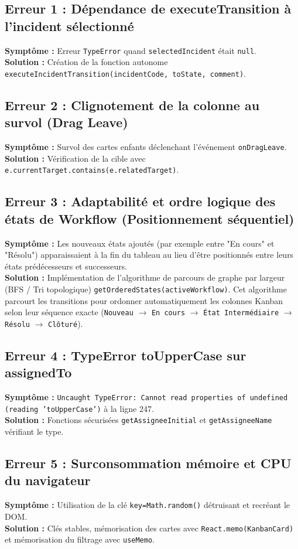 \documentclass[11pt,a4paper]{article}
\begin{document}
\subsection*{Erreur 1 : Dépendance de executeTransition à l'incident sélectionné}
\textbf{Symptôme :} Erreur \texttt{TypeError} quand \texttt{selectedIncident} était \texttt{null}.\\
\textbf{Solution :} Création de la fonction autonome \texttt{executeIncidentTransition(incidentCode, toState, comment)}.

\subsection*{Erreur 2 : Clignotement de la colonne au survol (Drag Leave)}
\textbf{Symptôme :} Survol des cartes enfants déclenchant l'événement \texttt{onDragLeave}.\\
\textbf{Solution :} Vérification de la cible avec \texttt{e.currentTarget.contains(e.relatedTarget)}.

\subsection*{Erreur 3 : Adaptabilité et ordre logique des états de Workflow (Positionnement séquentiel)}
\textbf{Symptôme :} Les nouveaux états ajoutés (par exemple entre "En cours" et "Résolu") apparaissaient à la fin du tableau au lieu d'être positionnés entre leurs états prédécesseurs et successeurs.\\
\textbf{Solution :} Implémentation de l'algorithme de parcours de graphe par largeur (BFS / Tri topologique) \texttt{getOrderedStates(activeWorkflow)}. Cet algorithme parcourt les transitions pour ordonner automatiquement les colonnes Kanban selon leur séquence exacte (\texttt{Nouveau} $\rightarrow$ \texttt{En cours} $\rightarrow$ \texttt{État Intermédiaire} $\rightarrow$ \texttt{Résolu} $\rightarrow$ \texttt{Clôturé}).


\subsection*{Erreur 4 : TypeError toUpperCase sur assignedTo}
\textbf{Symptôme :} \texttt{Uncaught TypeError: Cannot read properties of undefined (reading 'toUpperCase')} à la ligne 247.\\
\textbf{Solution :} Fonctions sécurisées \texttt{getAssigneeInitial} et \texttt{getAssigneeName} vérifiant le type.

\subsection*{Erreur 5 : Surconsommation mémoire et CPU du navigateur}
\textbf{Symptôme :} Utilisation de la clé \texttt{key=Math.random()} détruisant et recréant le DOM.\\
\textbf{Solution :} Clés stables, mémorisation des cartes avec \texttt{React.memo(KanbanCard)} et mémorisation du filtrage avec \texttt{useMemo}.
\end{document}
